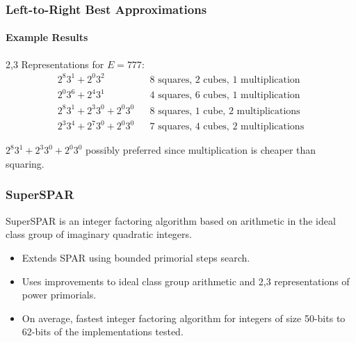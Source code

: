 \documentclass{beamer}
\begin{document}
\begin{frame}
\frametitle{Left-to-Right Best Approximations}
\framesubtitle{Example Results}
2,3 Representations for $E=777$:
\begin{align*}
2^8 3^1 + 2^0 3^2 && \textrm{8 squares, 2 cubes, 1 multiplication} \\
2^0 3^6 + 2^4 3^1 && \textrm{4 squares, 6 cubes, 1 multiplication} \\
2^8 3^1 + 2^3 3^0 + 2^0 3^0 && \textrm{8 squares, 1 cube, 2 multiplications} \\
2^3 3^4 + 2^7 3^0 + 2^0 3^0 && \textrm{7 squares, 4 cubes, 2 multiplications}
\end{align*}

\bigskip
$2^8 3^1 + 2^3 3^0 + 2^0 3^0$ possibly preferred since multiplication is cheaper than squaring.
\end{frame}




\begin{frame}
\frametitle{SuperSPAR}
SuperSPAR is an integer factoring algorithm based on arithmetic in the ideal class group of imaginary quadratic integers.
\begin{itemize}
\item Extends SPAR using bounded primorial steps search.
\item Uses improvements to ideal class group arithmetic and 2,3 representations of power primorials.
\item On average, fastest integer factoring algorithm for integers of size 50-bits to 62-bits of the implementations tested.
\end{itemize}
\end{frame}
\end{document}
